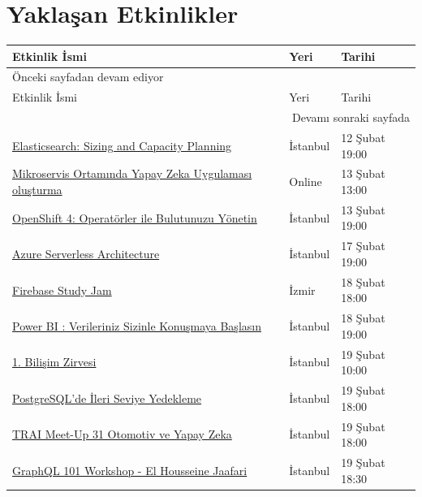 \documentclass[11pt]{article}
\begin{document}
\section{Yaklaşan Etkinlikler}
\label{sec:org30d1a5b}
\begin{longtable}{|p{8cm}|l|l|}
\hline
Etkinlik İsmi & Yeri & Tarihi\\
\hline
\endfirsthead
\multicolumn{3}{l}{Önceki sayfadan devam ediyor} \\
\hline

Etkinlik İsmi & Yeri & Tarihi \\

\hline
\endhead
\hline\multicolumn{3}{r}{Devamı sonraki sayfada} \\
\endfoot
\endlastfoot
\hline
\href{https://www.meetup.com/Turkey-Elastic-Fantastics/events/268505071/}{Elasticsearch: Sizing and Capacity Planning} & İstanbul & 12 Şubat 19:00\\
\href{https://www.meetup.com/IBMCloudTR/events/268445763/}{Mikroservis Ortamında Yapay Zeka Uygulaması oluşturma} & Online & 13 Şubat 13:00\\
\href{https://www.meetup.com/IBMCloudTR/events/267606312/}{OpenShift 4: Operatörler ile Bulutunuzu Yönetin} & İstanbul & 13 Şubat 19:00\\
\href{https://www.meetup.com/Microsoft-Giri\%25C5\%259Fimcilik-Bulu\%25C5\%259Fmalar\%25C4\%25B1/events/268435933/}{Azure Serverless Architecture} & İstanbul & 17 Şubat 19:00\\
\href{https://www.meetup.com/GDG-Cloud-Izmir/events/268271805/}{Firebase Study Jam} & İzmir & 18 Şubat 18:00\\
\href{https://www.meetup.com/Zemin-Istanbul/events/267959970/}{Power BI : Verileriniz Sizinle Konuşmaya Başlasın} & İstanbul & 18 Şubat 19:00\\
\href{https://kommunity.com/bilisimtoplulugu/events/1-bilisim-zirvesi}{1. Bilişim Zirvesi} & İstanbul & 19 Şubat 10:00\\
\href{https://kommunity.com/pgtr/events/postgresqlde-ileri-seviye-yedekleme-1}{PostgreSQL'de İleri Seviye Yedekleme} & İstanbul & 19 Şubat 18:00\\
\href{https://www.eventbrite.com/e/trai-meet-up31-otomotiv-ve-yapay-zeka-tickets-90220212083}{TRAI Meet-Up 31 Otomotiv ve Yapay Zeka} & İstanbul & 19 Şubat 18:00\\
\href{https://www.eventbrite.com/e/graphql-101-workshop-el-housseine-jaafari-devc-istanbul-tickets-93636351849}{GraphQL 101 Workshop - El Housseine Jaafari} & İstanbul & 19 Şubat 18:30\\

\end{longtable}
\end{document}
